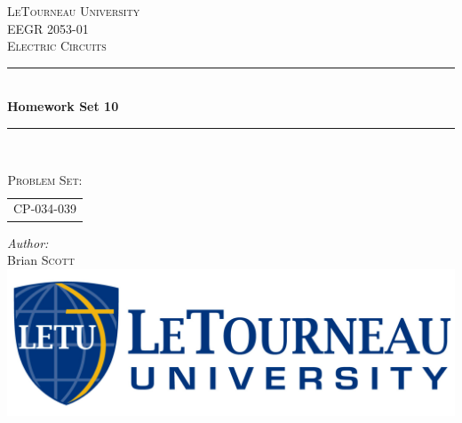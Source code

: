 \begin{titlepage}
\newcommand{\HRule}{\rule{\linewidth}{0.4mm}} 
\center
\textsc{\LARGE LeTourneau University}\\[1.5cm]
\textsc{\Large EEGR 2053-01}\\[0.5cm]
\textsc{\large Electric Circuits}\\[0.5cm]
\HRule \\[0.4cm]
{ \huge \bfseries Homework Set 10}\\[0.2cm]
\HRule \\[1.5cm]
\begin{table}[h]
\large
\ttfamily
\centering
\caption*{\textsc{\large Problem Set:}}
\label{tab:probset}
\begin{tabular}{l}
CP-034-039 \\[1.5cm]
\end{tabular}
\end{table}
\Large \emph{Author:}\\
Brian \textsc{Scott}\\[1cm]
{\large \datef{}}
\vfill
\includegraphics[scale=0.20]{gfx/logoHoriz.jpg}\\[1cm] 
\end{titlepage}